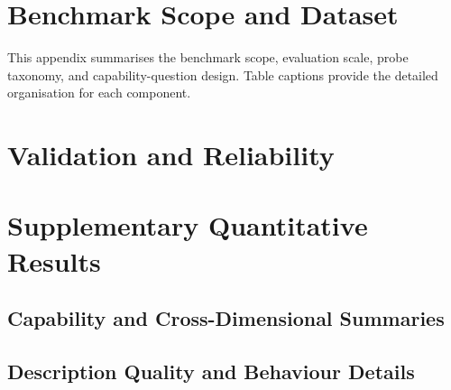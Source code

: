 \documentclass[11pt]{article}
\begin{document}
\clearpage
\appendix
\begin{nolinenumbers}
\raggedbottom
\onecolumn

\section{Benchmark Scope and Dataset}
\label{sec:appendix-scope-taxonomy}
\label{sec:benchmark-comparison}
\label{sec:dataset-details}
\label{sec:probe-taxonomy}
\label{sec:appendix-capability-categories}

This appendix summarises the benchmark scope, evaluation scale, probe taxonomy, and capability-question design. Table captions provide the detailed organisation for each component.





\clearpage

\twocolumn


\clearpage
\onecolumn

\twocolumn

\section{Validation and Reliability}
\label{sec:appendix-validation}

\label{sec:probe-designer-ablation}
\label{sec:stability-details}



\section{Supplementary Quantitative Results}
\label{sec:appendix-quant-results}

\subsection{Capability and Cross-Dimensional Summaries}
\label{sec:cross-dim}
\label{sec:capability-results}



\subsection{Description Quality and Behaviour Details}
\label{sec:appendix-chart-type}
\label{sec:mqm-details}
\label{sec:caption-bias-details}
\label{sec:significance}




\clearpage




\clearpage
\onecolumn

\clearpage
\end{nolinenumbers}
\twocolumn
\end{document}
